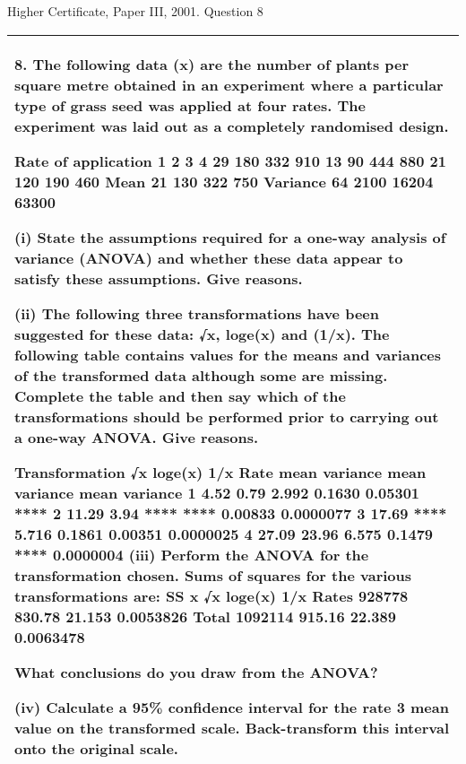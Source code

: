 \documentclass[a4paper,12pt]{article}
\begin{document}
Higher Certificate, Paper III, 2001. Question 8





\begin{table}[ht!]
     


\centering
     


\begin{tabular}{|p{15cm}|}
     


\hline 


8. The following data (x) are the number of plants per square metre obtained in an experiment where a particular type of grass seed was applied at four rates.  
The experiment was laid out as a completely randomised design. 
 
 Rate of application  1 2 3 4  29 180 332 910  13   90 444 880  21 120 190 460 Mean 21 130 322 750 Variance 64 2100 16204 63300 
 
(i) State the assumptions required for a one-way analysis of variance (ANOVA) and whether these data appear to satisfy these assumptions.  Give reasons.  
 
(ii) The following three transformations have been suggested for these data: √x, loge(x) and (1/x).  
The following table contains values for the means and variances of the transformed data although some are missing.  
Complete the table and then say which of the transformations should be performed prior to carrying out a one-way ANOVA.  Give reasons.  
 
Transformation √x loge(x) 1/x Rate mean variance mean variance mean variance 1   4.52   0.79 2.992 0.1630 0.05301 **** 2 11.29   3.94 **** **** 0.00833 0.0000077 3 17.69 **** 5.716 0.1861 0.00351 0.0000025 4 27.09 23.96 6.575 0.1479 **** 0.0000004   (iii) Perform the ANOVA for the transformation chosen.  Sums of squares for the various transformations are: 
 SS x √x loge(x) 1/x Rates 928778 830.78 21.153 0.0053826 Total 1092114 915.16 22.389 0.0063478 
 
What conclusions do you draw from the ANOVA? 
 
 
(iv) Calculate a 95\% confidence interval for the rate 3 mean value on the transformed scale.  Back-transform this interval onto the original scale.  
 
\\ \hline


\end{tabular}
    



\end{table}
\end{document}
